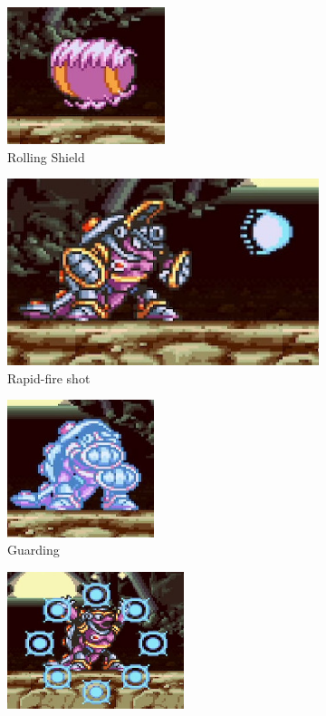 \begin{figure}[htp]
	\centering
	\begin{subfigure}{0.45\textwidth}
		\centering
		\includegraphics[height=4cm]{figures/X1/Armored_armadillo/Armadillo_rolling.jpg}
		\caption{Rolling Shield}
	\end{subfigure}
	\begin{subfigure}{0.45\textwidth}
		\centering
		\includegraphics[width=\linewidth]{figures/X1/Armored_armadillo/Armadillo_cannon.jpg}
		\caption{Rapid-fire shot}
	\end{subfigure}	
	\begin{subfigure}{0.45\textwidth}
		\centering
		\includegraphics[height=4cm]{figures/X1/Armored_armadillo/Armadillo_energy_1.jpg}
		\caption{Guarding}
	\end{subfigure}
	\begin{subfigure}{0.45\textwidth}
		\centering
		\includegraphics[height=4cm]{figures/X1/Armored_armadillo/Armadillo_energy_2.jpg}

\end{subfigure}
\end{figure}
